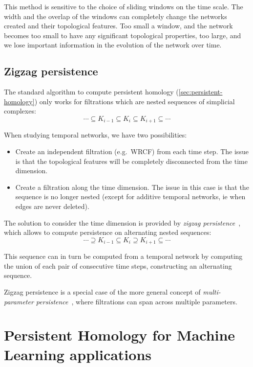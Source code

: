 \documentclass[a4paper,11pt,openany,extrafontsizes]{memoir}
\begin{document}
This method is sensitive to the choice of sliding windows on the time
scale. The width and the overlap of the windows can completely change
the networks created and their topological features. Too small a
window, and the network becomes too small to have any significant
topological properties, too large, and we lose important information
in the evolution of the network over time.

\section{Zigzag persistence}%
\label{sec:zigzag-persistence}

The standard algorithm to compute persistent homology
(\autoref{sec:persistent-homology}) only works for filtrations which
are nested sequences of simplicial complexes:
\[ \cdots \subseteq K_{i-1} \subseteq K_i \subseteq K_{i+1} \subseteq
  \cdots \]

When studying temporal networks, we have two possibilities:
\begin{itemize}
\item Create an independent filtration (e.g.\ WRCF) from each time
  step. The issue is that the topological features will be completely
  disconnected from the time dimension.
\item Create a filtration along the time dimension. The issue in this
  case is that the sequence is no longer nested (except for additive
  temporal networks, ie when edges are never deleted).
\end{itemize}

The solution to consider the time dimension is provided by
\emph{zigzag persistence}~\cite{carlsson_zigzag_2009}, which allows to
compute persistence on alternating nested sequences:
\[ \cdots \supseteq K_{i-1} \subseteq K_i \supseteq K_{i+1} \subseteq
  \cdots \]

This sequence can in turn be computed from a temporal network by
computing the union of each pair of consecutive time steps,
constructing an alternating sequence.

Zigzag persistence is a special case of the more general concept of
\emph{multi-parameter
  persistence}~\cite{carlsson_theory_2009,dey_computing_2014}, where
filtrations can span across multiple parameters.


\chapter{Persistent Homology for Machine Learning applications}%
\label{cha:pers-homol-mach}
\end{document}
